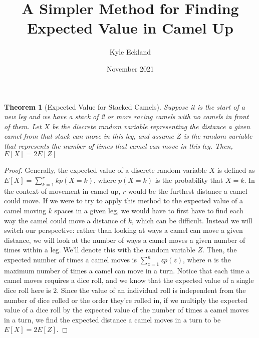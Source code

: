 \documentclass{article}
\title{A Simpler Method for Finding Expected Value in Camel Up}
\author{Kyle Eckland}
\date{November 2021}
\newtheorem{theorem}{Theorem}
\begin{document}
\maketitle

\begin{theorem}[Expected Value for Stacked Camels]
Suppose it is the start of a new leg and we have a stack of 2 or more racing camels with no camels in front of them. Let $X$ be the discrete random variable representing the distance a given camel from that stack can move in this leg, and assume $Z$ is the random variable that represents the number of times that camel can move in this leg. Then, $E[X] = 2E[Z]$
\end{theorem}

\begin{proof}
 Generally, the expected value of a discrete random variable $X$ is defined as $E[X] = \sum_{k = 1}^{r}kp(X=k)$, where $p(X = k)$ is the probability that $X = k$. In the context of movement in camel up, $r$ would be the furthest distance a camel could move. If we were to try to apply this method to the expected value of a camel moving $k$ spaces in a given leg, we would have to first have to find each way the camel could move a distance of $k$, which can be difficult.  Instead we will switch our perspective: rather than looking at ways a camel can move a given distance, we will look at the number of ways a camel moves a given number of times within a leg. We'll denote this with the random variable $Z$. Then, the expected number of times a camel moves is $\sum_{z=1}^{n}zp(z)$, where $n$ is the maximum number of times a camel can move in a turn. Notice that each time a camel moves requires a dice roll, and we know that the expected value of a single dice roll here is $2$. Since the value of an individual roll is independent from the number of dice rolled or the order they're rolled in, if we multiply the expected value of a dice roll by the expected value of the number of times a camel moves in a turn, we find the expected distance a camel moves in a turn to be $E[X] = 2E[Z]$.
\end{proof}
\end{document}
